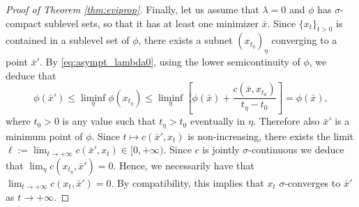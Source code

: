 \documentclass[reqno]{amsart}
\theoremstyle{plain}
\theoremstyle{remark}
\theoremstyle{plain}
\numberwithin{equation}{section}
\theoremstyle{remark}
\newcommand{\x}{\bar x}
\begin{document}
\begin{proof}[Proof of Theorem \ref{thm:eviprop}]
     Finally, let us assume that $\lambda=0$ and $\phi$ has $\sigma$-compact sublevel sets, so that it has at least one minimizer $\x$. Since  $\{x_t\}_{t>0}$  is contained in a sublevel set of $\phi$, there exists a subnet $(x_{t_\eta})_\eta$ converging to a point $\x'$. By \eqref{eq:asympt_lambda0}, using the lower semicontinuity of $\phi$, we deduce that 
    \[ \phi(\x') \le \liminf_\eta \phi(x_{t_\eta}) \le \liminf_{\eta} \left [ \phi(\x) + \frac{c(\x,x_{t_0})}{t_\eta-t_0} \right ] = \phi(\x),\]
    where $t_0 >0$ is any value such that $t_\eta >t_0$ eventually in $\eta$. Therefore also $\x'$ is a minimum point of $\phi$.  Since $t \mapsto c(\bar{x}', x_t)$ is non-increasing, there exists the limit $\ell:=\lim_{t \to + \infty} c(\bar{x}', x_t) \in [0,+\infty) $.  Since $c$ is  jointly  $\sigma$-continuous  we deduce that $\lim_\eta c(x_{t_\eta}, \x')=0$.  Hence, we necessarily have that  $\lim_{t \to + \infty} c(x_t, \x')=0$.  By compatibility, this implies  that $x_t$ $\sigma$-converges to $\x'$ as $t \to + \infty$.
    \end{proof}
\end{document}
